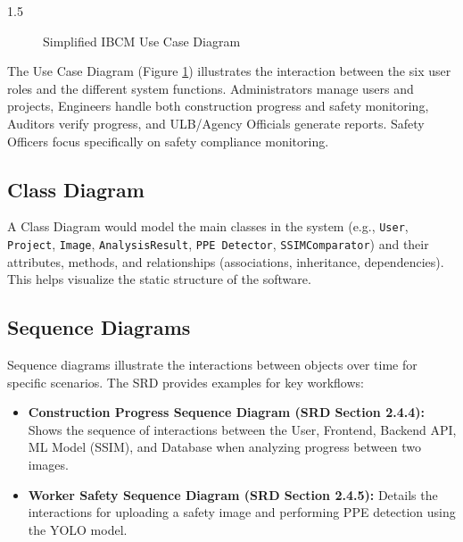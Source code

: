 \documentclass[12pt,a4paper]{report}
\begin{document}
\begin{spacing}{1.5}
\begin{figure}[H]
        \caption{Simplified IBCM Use Case Diagram}
        \label{fig:use_case_diagram}
    \end{figure}

    The Use Case Diagram (Figure \ref{fig:use_case_diagram}) illustrates the interaction between the six user roles and the different system functions. Administrators manage users and projects, Engineers handle both construction progress and safety monitoring, Auditors verify progress, and ULB/Agency Officials generate reports. Safety Officers focus specifically on safety compliance monitoring.

    \subsection{Class Diagram}
    A Class Diagram would model the main classes in the system (e.g., \texttt{User}, \texttt{Project}, \texttt{Image}, \texttt{AnalysisResult}, \texttt{PPE Detector}, \texttt{SSIMComparator}) and their attributes, methods, and relationships (associations, inheritance, dependencies). This helps visualize the static structure of the software.

    \subsection{Sequence Diagrams}
    Sequence diagrams illustrate the interactions between objects over time for specific scenarios. The SRD \cite{SRD_IBCM} provides examples for key workflows:
    \begin{itemize}
        \item \textbf{Construction Progress Sequence Diagram (SRD Section 2.4.4):} Shows the sequence of interactions between the User, Frontend, Backend API, ML Model (SSIM), and Database when analyzing progress between two images.
        \item \textbf{Worker Safety Sequence Diagram (SRD Section 2.4.5):} Details the interactions for uploading a safety image and performing PPE detection using the YOLO model.
    \end{itemize}


\end{spacing}
\end{document}
